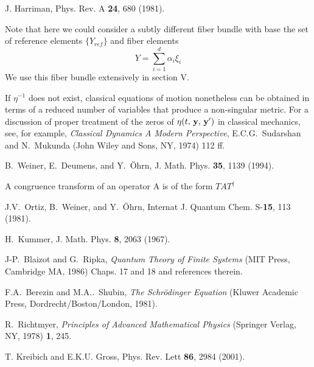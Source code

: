 \begin{references}
 J. Harriman, Phys. Rev. A {\bf 24}, 680 (1981).

 Note that here we could consider a subtly different
fiber bundle with base the set of reference elements $\{Y_{ref}\}$ and fiber
elements 
\[
Y=\sum_{i=1}^{d}\alpha _{i}\xi _{i} 
\]%
We use this fiber bundle extensively in section V.

 If $\eta^{-1}$ does not exist, classical equations of
motion nonetheless can be obtained in terms of a reduced number of variables
that produce a non-singular metric. For a discussion of proper treatment of
the zeros of $\eta(t,\, {\bf y},\, {\bf y}^{\prime}) $ in classical
mechanics, see, for example, {\it Classical Dynamics A Modern Perspective},
E.C.G.~Sudarshan and N.~Mukunda (John Wiley and Sons, NY, 1974) 112 ff.

 B.~Weiner, E.~Deumens, and Y.~\"{O}hrn, J. Math. Phys. {\bf %
35}, 1139 (1994).

 A congruence transform of an operator A is of the form $%
TAT^{\dag }$

 J.V.~Ortiz, B.~Weiner, and Y.~\"Ohrn, Internat J. Quantum
Chem. S-{\bf 15}, 113 (1981).

 H.~Kummer, J. Math. Phys. {\bf 8}, 2063 (1967).

 J-P.~Blaizot and G.~Ripka, {\it Quantum Theory of Finite
Systems} (MIT Press, Cambridge MA, 1986) Chaps. 17 and 18 and references
therein.

 F.A.~Berezin and M.A..~Shubin, {\it The
Schr\"odinger Equation} (Kluwer Academic Press, Dordrecht/Boston/London,
1981).

 R.~Richtmyer, {\it Principles of Advanced Mathematical
Physics} (Springer Verlag, NY, 1978) {\bf 1}, 245.

 T. Kreibich and E.K.U. Gross, Phys. Rev. Lett {\bf 86},
2984 (2001).
\end{references}


